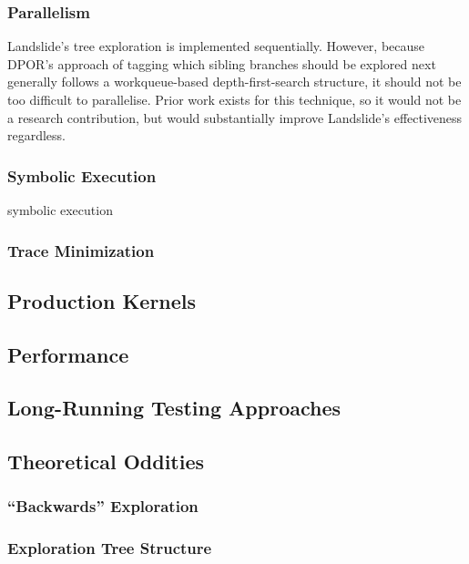 \subsubsection{Parallelism}

Landslide's tree exploration is implemented sequentially. However, because DPOR's approach of tagging which sibling branches should be explored next generally follows a workqueue-based depth-first-search structure, it should not be too difficult to parallelise. Prior work exists for this technique\cite{distributed-dpor}, so it would not be a research contribution, but would substantially improve Landslide's effectiveness regardless.

\subsubsection{Symbolic Execution}
symbolic execution\cite{klee,dawson}

\subsubsection{Trace Minimization}

\subsection{Production Kernels}
\label{sec:future-linux}


\subsection{Performance}
\label{sec:future-perf}

\subsection{Long-Running Testing Approaches}
\label{sec:future-shaping}

\subsection{Theoretical Oddities}
\label{sec:future-theory}

\subsubsection{``Backwards'' Exploration}
\label{sec:future-backwards}

\subsubsection{Exploration Tree Structure}
